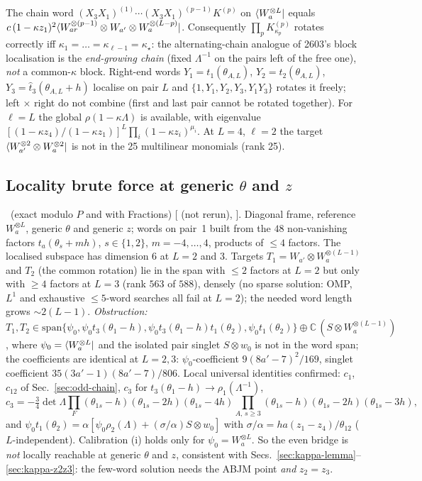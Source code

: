 The chain word $(X_3X_1)^{(1)}\cdots(X_3X_1)^{(p-1)}K^{(p)}$ on
$\langle W_a^{\otimes L}|$ equals $c\,(1-\kappa z_1)^2\langle W_{ar}^{\otimes(p-1)}\otimes W_{a'}\otimes W_a^{\otimes(L-p)}|$. Consequently $\prod_pK^{(p)}_{\kappa_p}$ rotates correctly iff $\kappa_1=\dots=\kappa_{\ell-1}=\kappa_\star$: the alternating-chain analogue of 2603's block localisation is the
\emph{end-growing chain} (fixed $\Lambda^{-1}$ on the pairs left of the free one), \emph{not} a common-$\kappa$ block. Right-end words $Y_1=t_1(\theta_{A,L})$, $Y_2=t_2(\theta_{A,L})$, $Y_3=\hat t_3(\theta_{A,L}+h)$ localise on pair $L$ and $\{1,Y_1,Y_2,Y_3,Y_1Y_3\}$ rotates it freely; left $\times$ right do not combine
(first and last pair cannot be rotated together). For $\ell=L$ the global $\rho(1-\kappa\Lambda)$ is available, with eigenvalue $[(1-\kappa z_4)/(1-\kappa z_1)]^L\prod_i(1-\kappa z_i)^{\mu_i}$. At $L=4$, $\ell=2$ the target $\langle W_{a'}^{\otimes2}\otimes W_a^{\otimes2}|$ is not in the 25 multilinear monomials (rank 25).

\subsection{Locality brute force at generic $\theta$ and $z$}\label{sec:kappa-generic}

\npy\ (exact modulo $P$ and with Fractions) [ (not rerun), ]. Diagonal frame, reference $W_a^{\otimes L}$, generic $\theta$ and generic $z$; words on pair~1 built from the $48$ non-vanishing factors $t_a(\theta_s+mh)$, $s\in\{1,2\}$, $m=-4,\dots,4$, products of $\le4$ factors. The localised subspace has dimension $6$ at $L=2$ and $3$.
Targets $T_1=W_{a'}\otimes W_a^{\otimes(L-1)}$ and $T_2$ (the common rotation) lie in the span with $\le2$ factors at $L=2$ but only with $\ge4$ factors at $L=3$ (rank $563$ of $588$), densely (no sparse solution: OMP, $L^1$ and exhaustive $\le5$-word searches all fail at $L=2$); the needed word length grows $\sim2(L-1)$.
\emph{Obstruction:} $T_1,T_2\in\mathrm{span}\{\psi_0,\psi_0t_3(\theta_1-h),\psi_0t_3(\theta_1-h)t_1(\theta_2),\psi_0t_1(\theta_2)\}\oplus\mathbb C\,(S\otimes W_a^{\otimes(L-1)})$, where $\psi_0=\langle W_a^{\otimes L}|$ and the isolated pair singlet $S\otimes w_0$ is not in the word span; the coefficients are identical at $L=2,3$:
$\psi_0$-coefficient $9(8a'-7)^2/169$, singlet coefficient $35(3a'-1)(8a'-7)/806$. Local universal identities confirmed: $c_1$, $c_{12}$ of Sec.~\ref{sec:odd-chain}, $c_3$ for $t_3(\theta_1-h)\to\rho_1(\Lambda^{-1})$,
\begin{equation}
 c_3=-\tfrac34\det\Lambda\prod_F(\theta_{1s}-h)(\theta_{1s}-2h)(\theta_{1s}-4h)\prod_{A,\,s\ge3}(\theta_{1s}-h)(\theta_{1s}-2h)(\theta_{1s}-3h),
\end{equation}
and $\psi_0t_1(\theta_2)=\alpha[\psi_0\rho_2(\Lambda)+(\sigma/\alpha)S\otimes w_0]$ with $\sigma/\alpha=ha(z_1-z_4)/\theta_{12}$ ($L$-independent). Calibration (i) holds only for $\psi_0=W_a^{\otimes L}$.
So the even bridge is \emph{not} locally reachable at generic $\theta$ and $z$, consistent with Secs.~\ref{sec:kappa-lemma}--\ref{sec:kappa-z2z3}: the few-word solution needs the ABJM point \emph{and} $z_2=z_3$.

